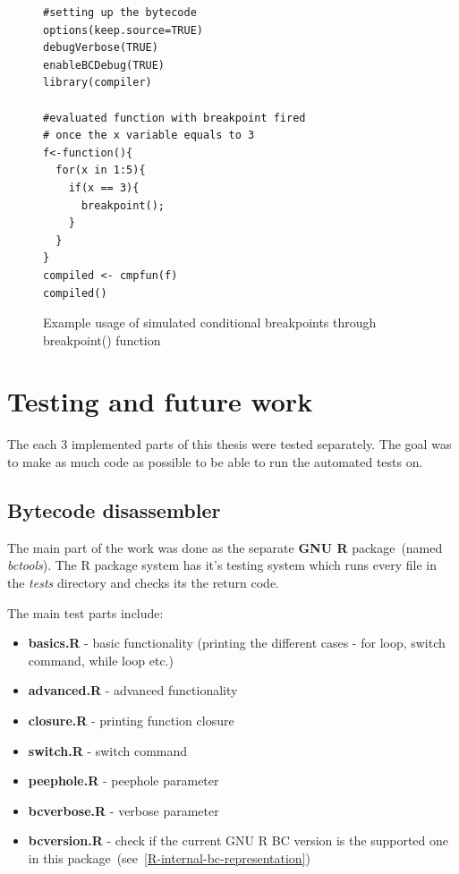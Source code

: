 \documentclass[thesis=M,english]{FITthesis}[2018/10/20]
\begin{document}
\begin{figure}[h!]
\begin{lstlisting}
#setting up the bytecode
options(keep.source=TRUE)
debugVerbose(TRUE)
enableBCDebug(TRUE)
library(compiler)

#evaluated function with breakpoint fired
# once the x variable equals to 3
f<-function(){
  for(x in 1:5){
    if(x == 3){
      breakpoint();
    }
  }
}
compiled <- cmpfun(f)
compiled()
\end{lstlisting}
	\caption{Example usage of simulated conditional breakpoints through breakpoint() function}\label{fig:example-of-conditional-breakpoints}
\end{figure}

\chapter{Testing and future work}

The each 3 implemented parts of this thesis were tested separately. The goal was to make as much code as possible to be able to run the automated tests on.

\section{Bytecode disassembler}

The main part of the work was done as the separate \textbf{GNU R} package~(named \textit{bctools}). The R package system has it's testing system which runs every file in the \textit{tests} directory and checks its the return code. 

The main test parts include:
\begin{itemize}
	\item \textbf{basics.R} - basic functionality (printing the different cases - for loop, switch command, while loop etc.)
	\item \textbf{advanced.R} - advanced functionality
	\item \textbf{closure.R} - printing function closure
	\item \textbf{switch.R} - switch command
	\item \textbf{peephole.R} - peephole parameter
	\item \textbf{bcverbose.R} - verbose parameter
	\item \textbf{bcversion.R} - check if the current GNU R BC version is the supported one in this package~(see~\ref{R-internal-bc-representation})
\end{itemize}
\end{document}
